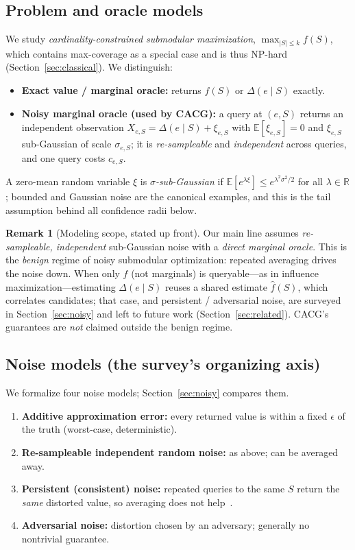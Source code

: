 \documentclass[11pt]{article}
\theoremstyle{plain}
\theoremstyle{definition}
\newtheorem{remark}{Remark}
\newcommand{\R}{\mathbb{R}}
\newcommand{\E}{\mathbb{E}}
\newcommand{\marg}[2]{\Delta(#1\mid #2)}
\begin{document}
\subsection{Problem and oracle models}
We study \emph{cardinality-constrained submodular maximization},
$\max_{|S|\le k} f(S)$, which contains max-coverage as a special case and
is thus NP-hard (Section~\ref{sec:classical}). We distinguish:
\begin{itemize}[leftmargin=1.4em,itemsep=1pt]
  \item \textbf{Exact value / marginal oracle:} returns $f(S)$ or
        $\marg{e}{S}$ exactly.
  \item \textbf{Noisy marginal oracle (used by CACG):} a query at $(e,S)$
        returns an independent observation
        $X_{e,S}=\marg{e}{S}+\xi_{e,S}$ with $\E[\xi_{e,S}]=0$ and
        $\xi_{e,S}$ sub-Gaussian of scale $\sigma_{e,S}$;
        it is \emph{re-sampleable} and \emph{independent} across queries,
        and one query costs $c_{e,S}$.
\end{itemize}
A zero-mean random variable $\xi$ is \emph{$\sigma$-sub-Gaussian} if
$\E[e^{\lambda\xi}]\le e^{\lambda^2\sigma^2/2}$ for all $\lambda\in\R$;
bounded and Gaussian noise are the canonical examples, and this is the
tail assumption behind all confidence radii below.

\begin{remark}[Modeling scope, stated up front]\label{rem:scope}
Our main line assumes \emph{re-sampleable, independent} sub-Gaussian noise
with a \emph{direct marginal oracle}. This is the \emph{benign} regime of
noisy submodular optimization: repeated averaging drives the noise down.
When only $f$ (not marginals) is queryable---as in influence
maximization---estimating $\marg{e}{S}$ reuses a shared estimate
$\widehat f(S)$, which correlates candidates; that case, and persistent /
adversarial noise, are surveyed in Section~\ref{sec:noisy} and left to
future work (Section~\ref{sec:related}). CACG's guarantees are \emph{not}
claimed outside the benign regime.
\end{remark}

\subsection{Noise models (the survey's organizing axis)}\label{sec:noisemodels}
We formalize four noise models; Section~\ref{sec:noisy} compares them.
\begin{enumerate}[leftmargin=1.4em,itemsep=1pt]
  \item \textbf{Additive approximation error:} every returned value is
        within a fixed $\epsilon$ of the truth (worst-case, deterministic).
  \item \textbf{Re-sampleable independent random noise:} as above; can be
        averaged away.
  \item \textbf{Persistent (consistent) noise:} repeated queries to the
        same $S$ return the \emph{same} distorted value, so averaging does
        not help~\cite{HassidimSinger2017}.
  \item \textbf{Adversarial noise:} distortion chosen by an adversary;
        generally no nontrivial guarantee.
\end{enumerate}
\end{document}

